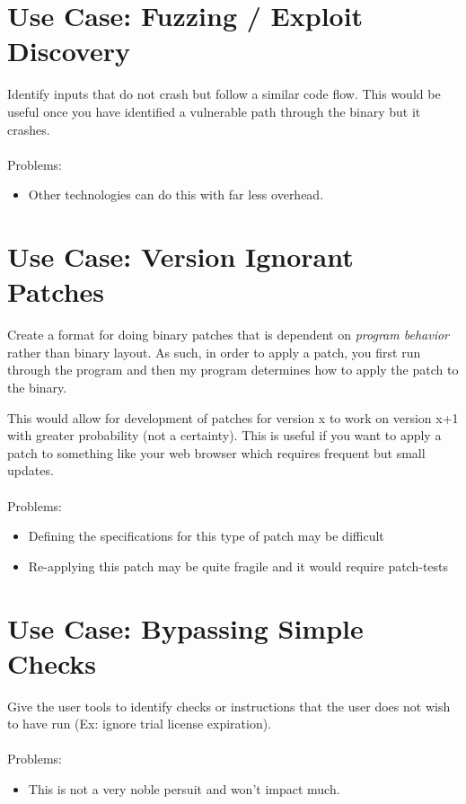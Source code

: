 \section{Use Case: Fuzzing / Exploit Discovery}
Identify inputs that do not crash but follow a similar code flow. This would be useful once you have identified a vulnerable path through the binary but it crashes. 
\\
\\
Problems: 
\begin{itemize}
  \item Other technologies can do this with far less overhead. 
\end{itemize}
\section{Use Case: Version Ignorant Patches}
Create a format for doing binary patches that is dependent on \textit{program behavior} rather than binary layout. As such, in order to apply a patch, you first run through the program and then my program determines how to apply the patch to the binary. 

This would allow for development of patches for version x to work on version x+1 with greater probability (not a certainty). This is useful if you want to apply a patch to something like your web browser which requires frequent but small updates. 
\\
\\
Problems:
\begin{itemize}
  \item Defining the specifications for this type of patch may be difficult
  \item Re-applying this patch may be quite fragile and it would require patch-tests
\end{itemize}

\section{Use Case: Bypassing Simple Checks}
Give the user tools to identify checks or instructions that the user does not wish to have run (Ex: ignore trial license expiration).
\\
\\
Problems:
\begin{itemize}
  \item This is not a very noble persuit and won't impact much.
\end{itemize}

